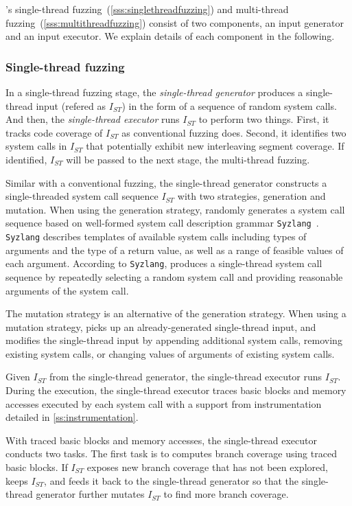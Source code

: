 \sys's single-thread fuzzing~(\autoref{sss:singlethreadfuzzing}) and
multi-thread fuzzing~(\autoref{sss:multithreadfuzzing}) consist of two
components, an input generator and an input executor. We explain
details of each component in the following.


\subsubsection{Single-thread fuzzing}
\label{sss:singlethreadfuzzing}
%
In a single-thread fuzzing stage, the \textit{single-thread generator}
produces a single-thread input (refered as $I_{ST}$) in the form of a
sequence of random system calls.
%
And then, the \textit{single-thread executor} runs $I_{ST}$ to perform
two things.
%
First, it tracks code coverage of $I_{ST}$ as conventional fuzzing
does. Second, it identifies two system calls in $I_{ST}$ that
potentially exhibit new interleaving segment coverage.  If identified,
$I_{ST}$ will be passed to the next stage, the multi-thread fuzzing.


%
Similar with a conventional fuzzing, the single-thread generator
constructs a single-threaded system call sequence $I_{ST}$ with two
strategies, generation and mutation.
%
When using the generation strategy, \sys randomly generates a system
call sequence based on well-formed system call description grammar
\texttt{Syzlang}~\cite{syzlang}.
%
\texttt{Syzlang} describes templates of available system calls
including types of arguments and the type of a return value, as well
as a range of feasible values of each argument.
%
According to \texttt{Syzlang}, \sys produces a single-thread system
call sequence by repeatedly selecting a random system call and
providing reasonable arguments of the system call.

The mutation strategy is an alternative of the generation strategy.
When using a mutation strategy, \sys picks up an already-generated
single-thread input, and modifies the single-thread input by appending
additional system calls, removing existing system calls, or changing
values of arguments of existing system calls.


%
Given $I_{ST}$ from the single-thread generator, the single-thread
executor runs $I_{ST}$.
%
During the execution, the single-thread executor traces basic blocks
and memory accesses executed by each system call with a support from
instrumentation detailed in \autoref{ss:instrumentation}.

With traced basic blocks and memory accesses, the single-thread
executor conducts two tasks.
%
The first task is to computes branch coverage using traced basic
blocks.
%
If $I_{ST}$ exposes new branch coverage that has not been explored,
\sys keeps $I_{ST}$, and feeds it back to the single-thread generator
so that the single-thread generator further mutates $I_{ST}$ to find
more branch coverage.


